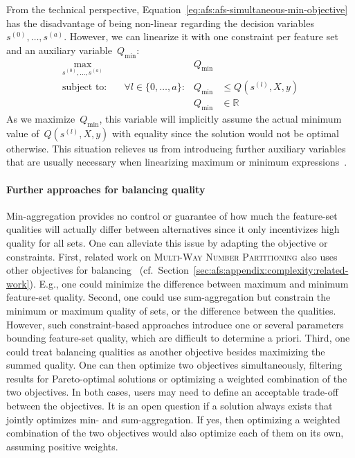 \documentclass{article}
\theoremstyle{definition}
\begin{document}
From the technical perspective, Equation~\ref{eq:afs:afs-simultaneous-min-objective} has the disadvantage of being non-linear regarding the decision variables $s^{(0)}, \dots, s^{(a)}$.
However, we can linearize it with one constraint per feature set and an auxiliary variable~$Q_{\text{min}}$:
%
\begin{equation}
	\begin{aligned}
		\max_{s^{(0)}, \dots, s^{(a)}} &\quad &Q_{\text{min}} & \\
		\text{subject to:} &\quad \forall l \in \{0, \dots, a\}: &Q_{\text{min}} &\leq Q(s^{(l)},X,y) \\
		&\quad & Q_{\text{min}} &\in \mathbb{R}
	\end{aligned}
	\label{eq:afs:afs-simultaneous-min-objective-linear}
\end{equation}
%
As we maximize~$Q_{\text{min}}$, this variable will implicitly assume the actual minimum value of~$Q(s^{(l)},X,y)$ with equality since the solution would not be optimal otherwise.
This situation relieves us from introducing further auxiliary variables that are usually necessary when linearizing maximum or minimum expressions~\cite{mosek2022modeling}.

\paragraph{Further approaches for balancing quality}

Min-aggregation provides no control or guarantee of how much the feature-set qualities will actually differ between alternatives since it only incentivizes high quality for all sets.
One can alleviate this issue by adapting the objective or constraints.
First, related work on \textsc{Multi-Way Number Partitioning} also uses other objectives for balancing~\cite{korf2010objective, lawrinenko2017identical} (cf.~Section~\ref{sec:afs:appendix:complexity:related-work}).
E.g., one could minimize the difference between maximum and minimum feature-set quality.
Second, one could use sum-aggregation but constrain the minimum or maximum quality of sets, or the difference between the qualities.
However, such constraint-based approaches introduce one or several parameters bounding feature-set quality, which are difficult to determine a priori.
Third, one could treat balancing qualities as another objective besides maximizing the summed quality.
One can then optimize two objectives simultaneously, filtering results for Pareto-optimal solutions or optimizing a weighted combination of the two objectives.
In both cases, users may need to define an acceptable trade-off between the objectives.
It is an open question if a solution always exists that jointly optimizes min- and sum-aggregation.
If yes, then optimizing a weighted combination of the two objectives would also optimize each of them on its own, assuming positive weights.
\end{document}
